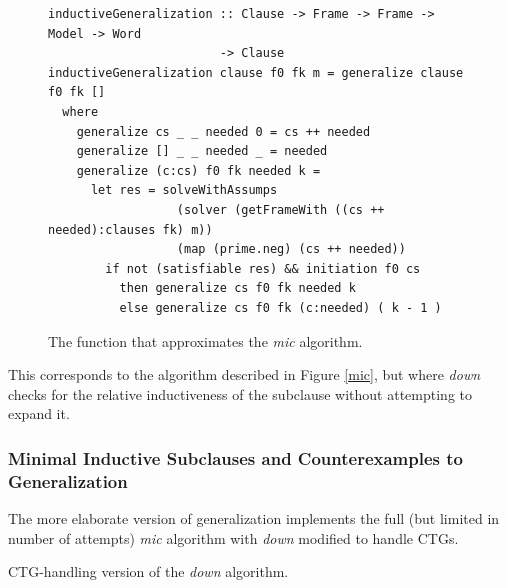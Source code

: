 \documentclass[12pt,a4paper,twoside,openright]{report}
\begin{document}
{{\begin{figure}[t]
\centering
\begin{lstlisting}
inductiveGeneralization :: Clause -> Frame -> Frame -> Model -> Word
                        -> Clause
inductiveGeneralization clause f0 fk m = generalize clause f0 fk []
  where
    generalize cs _ _ needed 0 = cs ++ needed
    generalize [] _ _ needed _ = needed
    generalize (c:cs) f0 fk needed k = 
      let res = solveWithAssumps
                  (solver (getFrameWith ((cs ++ needed):clauses fk) m))
                  (map (prime.neg) (cs ++ needed))
        if not (satisfiable res) && initiation f0 cs
          then generalize cs f0 fk needed k
          else generalize cs f0 fk (c:needed) ( k - 1 ) 
\end{lstlisting}
\caption{The function that approximates the {\it mic} algorithm.}
\label{inductiveGeneralization}
\end{figure}

This corresponds to the algorithm described in Figure \ref{mic}, but where {\it down}
checks for the relative inductiveness of the subclause without attempting to expand it.

\subsubsection{Minimal Inductive Subclauses and Counterexamples to Generalization}
The more elaborate version of generalization implements the full
(but limited in number of attempts) {\it mic} algorithm with {\it down} modified
to handle CTGs.

\begin{algorithm}[t]
\DontPrintSemicolon
{}
\caption{CTG-handling version of the {\it down} algorithm.}
\label{ctgdown}
\end{algorithm}

}}
\end{document}
